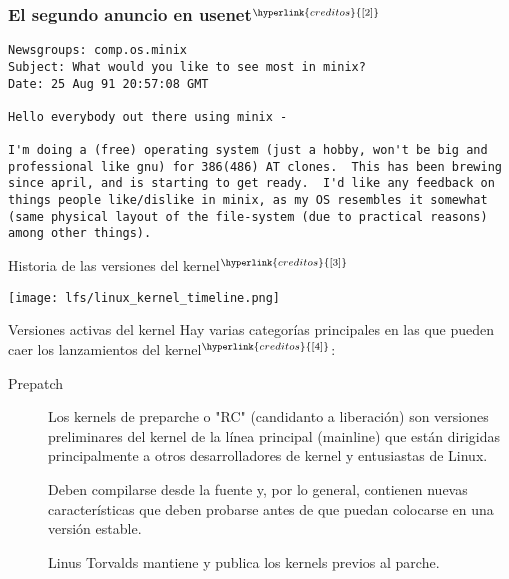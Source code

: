 \begin{frame}[fragile]
  \frametitle{El segundo anuncio en usenet$^{\hyperlink{creditos}{[2]}}$}
  \begin{block}{}
  \begin{verbatim}
Newsgroups: comp.os.minix
Subject: What would you like to see most in minix?
Date: 25 Aug 91 20:57:08 GMT

Hello everybody out there using minix -

I'm doing a (free) operating system (just a hobby, won't be big and
professional like gnu) for 386(486) AT clones.  This has been brewing
since april, and is starting to get ready.  I'd like any feedback on
things people like/dislike in minix, as my OS resembles it somewhat
(same physical layout of the file-system (due to practical reasons)
among other things).
  \end{verbatim}
  \end{block}
\end{frame}

\begin{frame}[c]{Historia de las versiones del kernel$^{\hyperlink{creditos}{[3]}}$}
  \begin{center}
    \texttt{[image: lfs/linux\_kernel\_timeline.png]}
  \end{center}
\end{frame}

\begin{frame}[c]{Versiones activas del kernel}
  Hay varias categorías principales en las que pueden caer los
  lanzamientos del kernel$^{\hyperlink{creditos}{[4]}}$:

  \vspace{\baselineskip}
  \begin{description}
    \item[Prepatch] Los kernels de preparche o "RC" (candidanto a
      liberación) son versiones preliminares del kernel de la línea principal
      (mainline) que están dirigidas principalmente a otros desarrolladores
      de kernel y entusiastas de Linux.

      \vspace{\baselineskip}
      Deben compilarse desde la fuente y, por lo general, contienen nuevas
      características que deben probarse antes de que puedan colocarse en
      una versión estable.

      \vspace{\baselineskip}
      Linus Torvalds mantiene y publica los kernels previos al parche.
  \end{description}
\end{frame}

